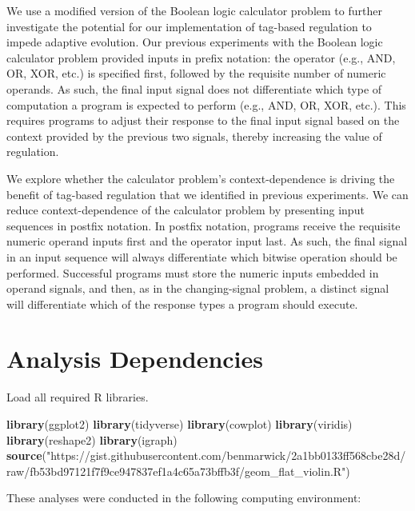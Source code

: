 \documentclass[
]{book}
\newenvironment{Shaded}{\begin{snugshade}}{\end{snugshade}}
\newcommand{\KeywordTok}[1]{\textcolor[rgb]{0.13,0.29,0.53}{\textbf{#1}}}
\newcommand{\NormalTok}[1]{#1}
\newcommand{\StringTok}[1]{\textcolor[rgb]{0.31,0.60,0.02}{#1}}
\begin{document}
We use a modified version of the Boolean logic calculator problem to further investigate the potential for our implementation of tag-based regulation to impede adaptive evolution.
Our previous experiments with the Boolean logic calculator problem provided inputs in prefix notation: the operator (e.g., AND, OR, XOR, etc.) is specified first, followed by the requisite number of numeric operands.
As such, the final input signal does not differentiate which type of computation a program is expected to perform (e.g., AND, OR, XOR, etc.).
This requires programs to adjust their response to the final input signal based on the context provided by the previous two signals, thereby increasing the value of regulation.

We explore whether the calculator problem's context-dependence is driving the benefit of tag-based regulation that we identified in previous experiments.
We can reduce context-dependence of the calculator problem by presenting input sequences in postfix notation.
In postfix notation, programs receive the requisite numeric operand inputs first and the operator input last.
As such, the final signal in an input sequence will always differentiate which bitwise operation should be performed.
Successful programs must store the numeric inputs embedded in operand signals, and then, as in the changing-signal problem, a distinct signal will differentiate which of the response types a program should execute.

\hypertarget{analysis-dependencies-4}{%
\section{Analysis Dependencies}\label{analysis-dependencies-4}}

Load all required R libraries.

\begin{Shaded}
\begin{Highlighting}[]
\KeywordTok{library}\NormalTok{(ggplot2)}
\KeywordTok{library}\NormalTok{(tidyverse)}
\KeywordTok{library}\NormalTok{(cowplot)}
\KeywordTok{library}\NormalTok{(viridis)}
\KeywordTok{library}\NormalTok{(reshape2)}
\KeywordTok{library}\NormalTok{(igraph)}
\KeywordTok{source}\NormalTok{(}\StringTok{"https://gist.githubusercontent.com/benmarwick/2a1bb0133ff568cbe28d/raw/fb53bd97121f7f9ce947837ef1a4c65a73bffb3f/geom\_flat\_violin.R"}\NormalTok{)}
\end{Highlighting}
\end{Shaded}

These analyses were conducted in the following computing environment:
\end{document}
